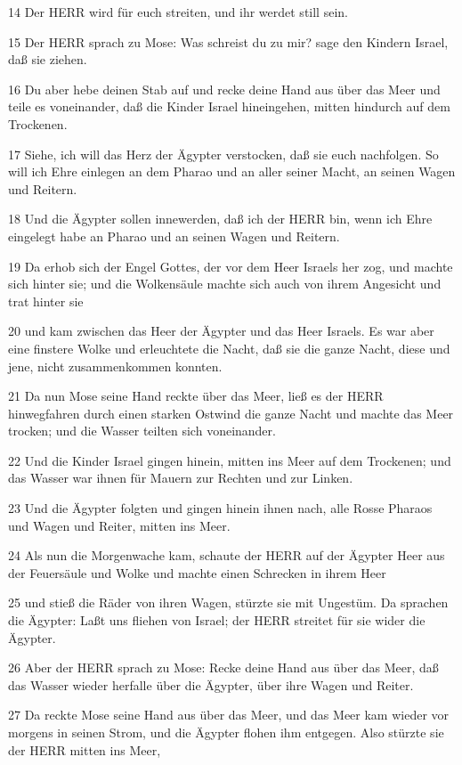\par 14 Der HERR wird für euch streiten, und ihr werdet still sein.
\par 15 Der HERR sprach zu Mose: Was schreist du zu mir? sage den Kindern Israel, daß sie ziehen.
\par 16 Du aber hebe deinen Stab auf und recke deine Hand aus über das Meer und teile es voneinander, daß die Kinder Israel hineingehen, mitten hindurch auf dem Trockenen.
\par 17 Siehe, ich will das Herz der Ägypter verstocken, daß sie euch nachfolgen. So will ich Ehre einlegen an dem Pharao und an aller seiner Macht, an seinen Wagen und Reitern.
\par 18 Und die Ägypter sollen innewerden, daß ich der HERR bin, wenn ich Ehre eingelegt habe an Pharao und an seinen Wagen und Reitern.
\par 19 Da erhob sich der Engel Gottes, der vor dem Heer Israels her zog, und machte sich hinter sie; und die Wolkensäule machte sich auch von ihrem Angesicht und trat hinter sie
\par 20 und kam zwischen das Heer der Ägypter und das Heer Israels. Es war aber eine finstere Wolke und erleuchtete die Nacht, daß sie die ganze Nacht, diese und jene, nicht zusammenkommen konnten.
\par 21 Da nun Mose seine Hand reckte über das Meer, ließ es der HERR hinwegfahren durch einen starken Ostwind die ganze Nacht und machte das Meer trocken; und die Wasser teilten sich voneinander.
\par 22 Und die Kinder Israel gingen hinein, mitten ins Meer auf dem Trockenen; und das Wasser war ihnen für Mauern zur Rechten und zur Linken.
\par 23 Und die Ägypter folgten und gingen hinein ihnen nach, alle Rosse Pharaos und Wagen und Reiter, mitten ins Meer.
\par 24 Als nun die Morgenwache kam, schaute der HERR auf der Ägypter Heer aus der Feuersäule und Wolke und machte einen Schrecken in ihrem Heer
\par 25 und stieß die Räder von ihren Wagen, stürzte sie mit Ungestüm. Da sprachen die Ägypter: Laßt uns fliehen von Israel; der HERR streitet für sie wider die Ägypter.
\par 26 Aber der HERR sprach zu Mose: Recke deine Hand aus über das Meer, daß das Wasser wieder herfalle über die Ägypter, über ihre Wagen und Reiter.
\par 27 Da reckte Mose seine Hand aus über das Meer, und das Meer kam wieder vor morgens in seinen Strom, und die Ägypter flohen ihm entgegen. Also stürzte sie der HERR mitten ins Meer,
